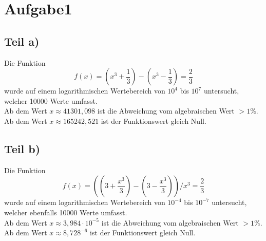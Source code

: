 \section{Aufgabe1}
\label{sec:Aufgabe1}
\subsection{Teil a)}
Die Funktion
\begin{equation*}
  f(x)=\left(x^3+\frac{1}{3}\right)-\left(x^3-\frac{1}{3}\right)=\frac{2}{3}
\end{equation*}
wurde auf einem logarithmischen Wertebereich von $10^4$ bis $10^7$ untersucht,
welcher 10000 Werte umfasst.\\
Ab dem Wert $x\approx 41301,098$ ist die Abweichung vom algebraischen Wert $>1\%$.\\
Ab dem Wert $x\approx 165242,521$ ist der Funktionswert gleich Null.
\subsection{Teil b)}
Die Funktion
\begin{equation*}
  f(x)=\left(\left(3+\frac{x^3}{3}\right)-\left(3-\frac{x^3}{3}\right)\right)/x^3=\frac{2}{3}
\end{equation*}
wurde auf einem logarithmischen Wertebereich von $10^{-4}$ bis $10^{-7}$ untersucht,
welcher ebenfalls 10000 Werte umfasst.\\
Ab dem Wert $x\approx 3,984\cdot10^{-5}$ ist die Abweichung vom algebraischen Wert $>1\%$.\\
Ab dem Wert $x\approx 8,728^{-6}$ ist der Funktionswert gleich Null.
